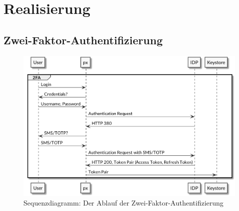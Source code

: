 \section{Realisierung}

\subsection{Zwei-Faktor-Authentifizierung}

\begin{figure}
    \centering
    \includegraphics[width=\linewidth]{pics/sequence-2fa.png}
    \caption{Sequenzdiagramm: Der Ablauf der Zwei-Faktor-Authentifizierung}
\end{figure}
